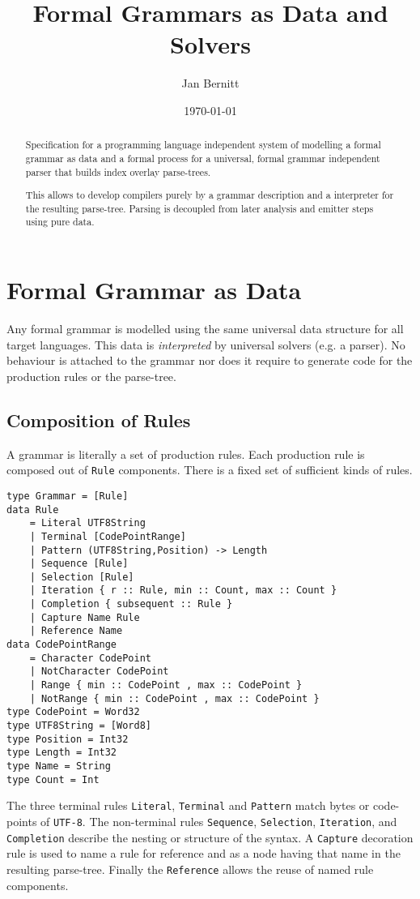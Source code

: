\documentclass[10pt,a4paper]{article}
\begin{document}
\lstset{language=Haskell}
\title{Formal Grammars as Data and Solvers}
\author{Jan Bernitt}
\date{\today}
\maketitle

\begin{abstract}
\noindent Specification for a programming language independent system of modelling a formal grammar as data and a formal process for a universal, formal grammar independent parser that builds index overlay parse-trees. 

This allows to develop compilers purely by a grammar description and a interpreter for the resulting parse-tree. Parsing is decoupled from later analysis and emitter steps using pure data.
\end{abstract}
\section{Formal Grammar as Data}
Any formal grammar is modelled using the same universal data structure for all target languages. This data is \emph{interpreted} by universal solvers (e.g. a parser). No behaviour is attached to the grammar nor does it require to generate code for the production rules or the parse-tree.

\subsection{Composition of Rules}
A grammar is literally a set of production rules. Each production rule is composed out of \texttt{Rule} components. There is a fixed set of sufficient kinds of rules.
\begin{lstlisting}
type Grammar = [Rule]
data Rule
	= Literal UTF8String
	| Terminal [CodePointRange]
	| Pattern (UTF8String,Position) -> Length
	| Sequence [Rule]
	| Selection [Rule]
	| Iteration { r :: Rule, min :: Count, max :: Count }
	| Completion { subsequent :: Rule }
	| Capture Name Rule
	| Reference Name
data CodePointRange
	= Character CodePoint
	| NotCharacter CodePoint
	| Range { min :: CodePoint , max :: CodePoint }
	| NotRange { min :: CodePoint , max :: CodePoint }
type CodePoint = Word32
type UTF8String = [Word8]
type Position = Int32
type Length = Int32
type Name = String
type Count = Int
\end{lstlisting}
 The three terminal rules \texttt{Literal}, \texttt{Terminal} and \texttt{Pattern} match bytes or code-points of \texttt{UTF-8}. The non-terminal rules \texttt{Sequence}, \texttt{Selection}, \texttt{Iteration}, and \texttt{Completion} describe the nesting or structure of the syntax. A \texttt{Capture} decoration rule is used to name a rule for reference and as a node having that name in the resulting parse-tree. Finally the \texttt{Reference} allows the reuse of named rule components.
\end{document}
